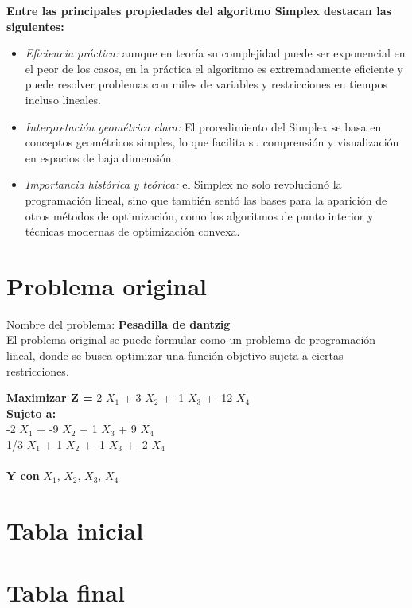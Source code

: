 \documentclass[12pt]{article}
\begin{document}
\textbf{Entre las principales propiedades del algoritmo Simplex destacan las siguientes:}
\begin{itemize}
  \item \textit{Eficiencia práctica:} aunque en teoría su complejidad puede ser exponencial en el peor de los casos, en la práctica el algoritmo es extremadamente eficiente y puede resolver problemas con miles de variables y restricciones en tiempos incluso lineales.
  \item \textit{Interpretación geométrica clara:} El procedimiento del Simplex se basa en conceptos geométricos simples, lo que facilita su comprensión y visualización en espacios de baja dimensión.
  \item \textit{Importancia histórica y teórica:} el Simplex no solo revolucionó la programación lineal, sino que también sentó las bases para la aparición de otros métodos de optimización, como los algoritmos de punto interior y técnicas modernas de optimización convexa.
\end{itemize}

\bigskip
\section*{Problema original}
Nombre del problema: \textbf{Pesadilla de dantzig}\\[0.3cm]
El problema original se puede formular como un problema de programación lineal, donde se busca optimizar una función objetivo sujeta a ciertas restricciones.

\textbf

{Maximizar Z = } 2 $X_1$ + 3 $X_2$ + -1 $X_3$ + -12 $X_4$\\[0.5cm]
\textbf{Sujeto a:}\\
-2 $X_1$ + -9 $X_2$ + 1 $X_3$ + 9 $X_4$  \\
1/3 $X_1$ + 1 $X_2$ + -1 $X_3$ + -2 $X_4$  \\
\\[0.3cm]
\textbf{Y con } $X_1$, $X_2$, $X_3$, $X_4$ \\[0.5cm]
\bigskip
\section*{Tabla inicial}
\newpage
\section*{Tabla final}
\end{document}
